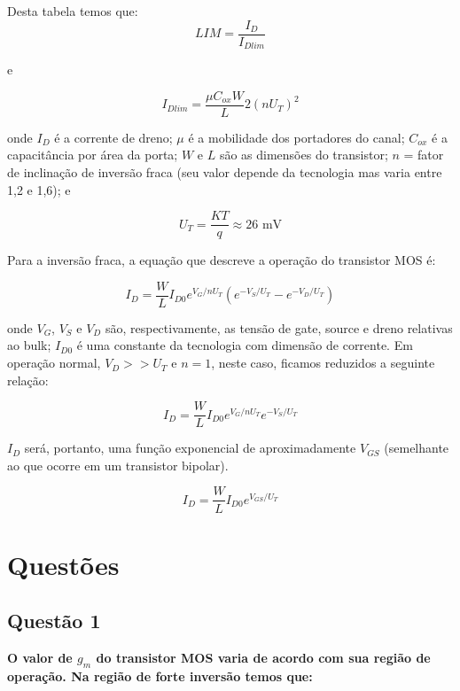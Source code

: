 ﻿\documentclass[12pt,a4paper]{article}
\begin{document}
Desta tabela temos que:
\begin{equation}
LIM = \frac{I_D}{I_{Dlim}}
\end{equation}

e

\begin{equation}
I_{Dlim} = \frac{\mu C_{ox} W}{L} 2 \left(nU_T\right)^2
\end{equation}

onde $I_D$ é a corrente de dreno; $\mu$ é a mobilidade dos portadores do canal; $C_{ox}$ é a capacitância por área da porta; $W$ e $L$ são as dimensões do transistor; $n$ = fator de inclinação de inversão fraca (seu valor depende da tecnologia mas varia entre 1,2 e 1,6); e

\begin{equation}
U_T = \frac{KT}{q} \approx 26 \text{ mV}
\end{equation}

Para a inversão fraca, a equação que descreve a operação do transistor MOS é:

\begin{equation}
I_D = \frac{W}{L} I_{D0} e^{V_G/nU_T} \left( e^{-V_S/U_T} - e^{-V_D/U_T} \right)
\end{equation}

onde $V_G$, $V_S$ e $V_D$ são, respectivamente, as tensão de gate, source e dreno relativas ao bulk; $I_{D0}$ é uma constante da tecnologia com dimensão de corrente. Em operação normal, $V_D >> U_T$ e $n = 1$, neste caso, ficamos reduzidos a seguinte relação:

\begin{equation}
I_D = \frac{W}{L} I_{D0} e^{V_G/nU_T} e^{-V_S/U_T}
\end{equation}

$I_D$ será, portanto, uma função exponencial de aproximadamente $V_{GS}$ (semelhante ao que ocorre em um transistor bipolar).

\begin{equation}
I_D = \frac{W}{L} I_{D0} e^{V_{GS}/U_T}
\end{equation}

\newpage

\section*{Questões}

\subsection*{Questão 1}
\textbf{O valor de $g_m$ do transistor MOS varia de acordo com sua região de operação. Na região de forte inversão temos que:}
\end{document}
